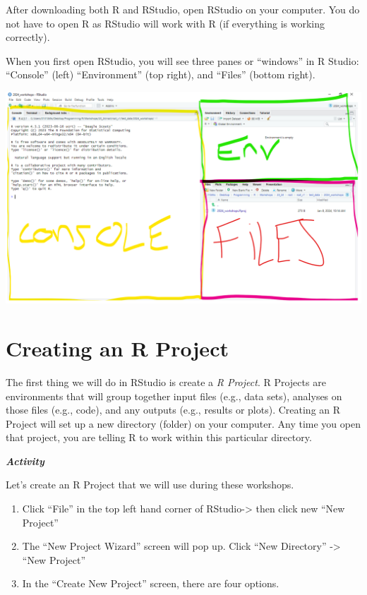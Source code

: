 \documentclass[
]{book}
\begin{document}
After downloading both R and RStudio, open RStudio on your computer. You do not have to open R as RStudio will work with R (if everything is working correctly).

When you first open RStudio, you will see three panes or ``windows'' in R Studio: ``Console'' (left) ``Environment'' (top right), and ``Files'' (bottom right).

\includegraphics{img/rstudio_first.png}

\hypertarget{creating-an-r-project}{%
\section{Creating an R Project}\label{creating-an-r-project}}

The first thing we will do in RStudio is create a \emph{R Project}. R Projects are environments that will group together input files (e.g., data sets), analyses on those files (e.g., code), and any outputs (e.g., results or plots). Creating an R Project will set up a new directory (folder) on your computer. Any time you open that project, you are telling R to work within this particular directory.

\textbf{\emph{Activity}}

Let's create an R Project that we will use during these workshops.

\begin{enumerate}
\def\labelenumi{\arabic{enumi}.}
\item
  Click ``File'' in the top left hand corner of RStudio-\textgreater{} then click new ``New Project''
\item
  The ``New Project Wizard'' screen will pop up. Click ``New Directory'' -\textgreater{} ``New Project''
\item
  In the ``Create New Project'' screen, there are four options.
\end{enumerate}
\end{document}
